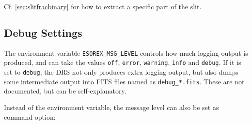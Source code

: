 Cf. \ref{sec:slitfracbinary} for how to extract a specific part of the slit.


\subsection{Debug Settings}

The environment variable \texttt{ESOREX\_MSG\_LEVEL} controls how much logging
output is produced, and can take the values \texttt{off}, \texttt{error},
\texttt{warning}, \texttt{info} and \texttt{debug}. If it is set to
\texttt{debug}, the DRS not only produces extra logging output, but also dumps
some intermediate output into FITS files named as \texttt{debug\_*.fits}. These
are not documented, but can be self-explanatory.

Instead of the environment variable, the message level can also be set as
command option:
\begin{shell}
\end{shell}